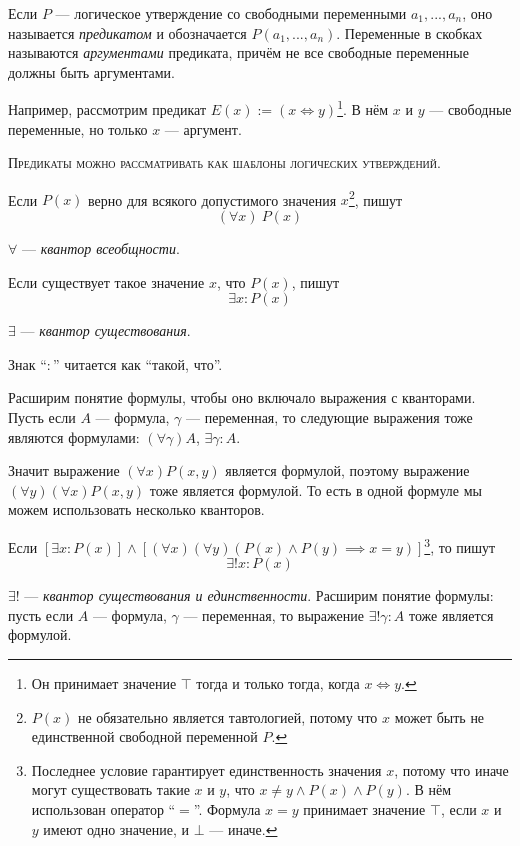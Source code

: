 Если $P$ --- логическое утверждение со свободными переменными $a_1,...,a_{n}$,
оно называется {\it предикатом} и обозначается $P(a_1,...,a_{n})$. Переменные
в скобках называются {\it аргументами} предиката, причём не все свободные
переменные должны быть аргументами.

Например, рассмотрим предикат ${E(x):=(x\iff y)}$\footnote{Он принимает
	значение $\top$ тогда и только тогда, когда $x\iff y$.}. В нём
$x$ и $y$ --- свободные переменные, но только
$x$ --- аргумент.

\textsc{Предикаты можно рассматривать как шаблоны логических утверждений.}

Если $P(x)$ верно для всякого допустимого значения $x$\footnote{$P(x)$ не обязательно
	является тавтологией, потому что $x$ может быть не единственной
	свободной переменной $P$.}, пишут
\[
	(\forall x)~P(x)
\]

$\forall$ --- {\it квантор всеобщности}.

Если существует такое значение $x$, что $P(x)$, пишут
\[
	\exists x:P(x)
\]

$\exists$ --- {\it квантор существования}.

Знак ``$:$'' читается как ``такой, что''.

Расширим понятие формулы, чтобы оно включало выражения с кванторами.
Пусть если $A$ --- формула, $\gamma$ --- переменная,
то следующие выражения тоже являются формулами:
$(\forall \gamma)A$, ${\exists \gamma:A}$.

Значит выражение
$(\forall x)P(x,y)$ является формулой, поэтому выражение
$(\forall y)(\forall x)P(x,y)$ тоже является формулой.
То есть в одной формуле мы можем использовать несколько кванторов.

Если ${[\exists x:P(x)]\land[(\forall x)(\forall y)(P(x)
				\land P(y)\implies x=y)]}$\footnote{
	Последнее
	условие гарантирует единственность значения $x$, потому что иначе
	могут существовать такие $x$ и $y$, что $x\neq y\land P(x)\land P(y)$.
	В нём использован оператор ``$=$''.
	Формула $x=y$ принимает значение $\top$, если $x$ и $y$ имеют одно значение,
	и $\bot$ --- иначе.}, то пишут
\[
	\exists! x:P(x)
\]

$\exists!$ --- {\it квантор существования и единственности}. Расширим
понятие формулы: пусть если
$A$ --- формула, $\gamma$ --- переменная, то выражение ${\exists!\gamma: A}$
тоже является формулой.


